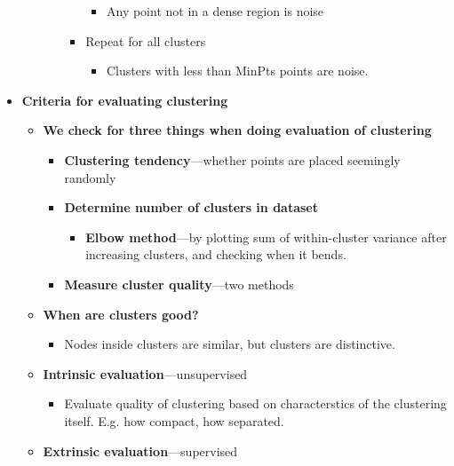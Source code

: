 \begin{multicols}{2}
\begin{itemize}
\begin{itemize}
\begin{itemize}
\begin{itemize}
        \begin{itemize}
                \item
          Any point not in a dense region is noise
        \end{itemize}
      \item
        Repeat for all clusters

        \begin{itemize}
                \item
          Clusters with less than MinPts points are noise.
        \end{itemize}
      \end{itemize}
    \end{itemize}
  \end{itemize}
\item
  \textbf{Criteria for evaluating clustering}

  \begin{itemize}
    \item
    \textbf{We check for three things when doing evaluation of
    clustering}

    \begin{itemize}
        \item
      \textbf{Clustering tendency}---whether points are placed seemingly
      randomly
    \item
      \textbf{Determine number of clusters in dataset}

      \begin{itemize}
            \item
        \textbf{Elbow method}---by plotting sum of within-cluster
        variance after increasing clusters, and checking when it bends.
      \end{itemize}
    \item
      \textbf{Measure cluster quality}---two methods
    \end{itemize}
  \item
    \textbf{When are clusters good?}

    \begin{itemize}
        \item
      Nodes inside clusters are similar, but clusters are distinctive.
    \end{itemize}
  \item
    \textbf{Intrinsic evaluation}---unsupervised

    \begin{itemize}
        \item
      Evaluate quality of clustering based on characterstics of the
      clustering itself. E.g. how compact, how separated.
    \end{itemize}
  \item
    \textbf{Extrinsic evaluation}---supervised


\end{itemize}
\end{itemize}
\end{multicols}
